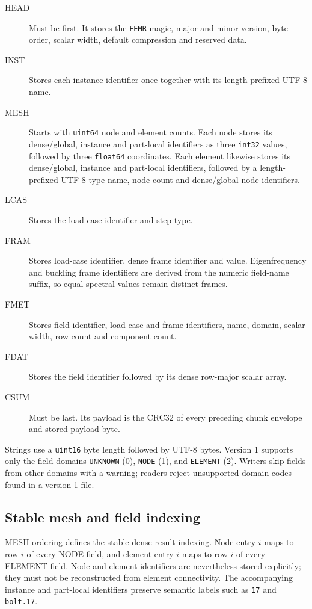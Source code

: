 \begin{description}
  \item[HEAD] Must be first. It stores the \texttt{FEMR} magic, major and minor
  version, byte order, scalar width, default compression and reserved data.
  \item[INST] Stores each instance identifier once together with its
  length-prefixed UTF-8 name.
  \item[MESH] Starts with \texttt{uint64} node and element counts. Each node
  stores its dense/global, instance and part-local identifiers as three
  \texttt{int32} values, followed by three \texttt{float64} coordinates. Each
  element likewise stores its dense/global, instance and part-local identifiers,
  followed by a length-prefixed UTF-8 type name, node count and dense/global node
  identifiers.
  \item[LCAS] Stores the load-case identifier and step type.
  \item[FRAM] Stores load-case identifier, dense frame identifier and value.
  Eigenfrequency and buckling frame identifiers are derived from the numeric
  field-name suffix, so equal spectral values remain distinct frames.
  \item[FMET] Stores field identifier, load-case and frame identifiers, name,
  domain, scalar width, row count and component count.
  \item[FDAT] Stores the field identifier followed by its dense row-major scalar
  array.
  \item[CSUM] Must be last. Its payload is the CRC32 of every preceding chunk
  envelope and stored payload byte.
\end{description}

Strings use a \texttt{uint16} byte length followed by UTF-8 bytes. Version 1
supports only the field domains \texttt{UNKNOWN} (0), \texttt{NODE} (1), and
\texttt{ELEMENT} (2). Writers skip fields from other domains with a warning;
readers reject unsupported domain codes found in a version 1 file.

\subsection{Stable mesh and field indexing}

MESH ordering defines the stable dense result indexing. Node entry $i$ maps to
row $i$ of every NODE field, and element entry $i$ maps to row $i$ of every
ELEMENT field. Node and element identifiers are nevertheless stored explicitly;
they must not be reconstructed from element connectivity. The accompanying
instance and part-local identifiers preserve semantic labels such as
\texttt{17} and \texttt{bolt.17}.

